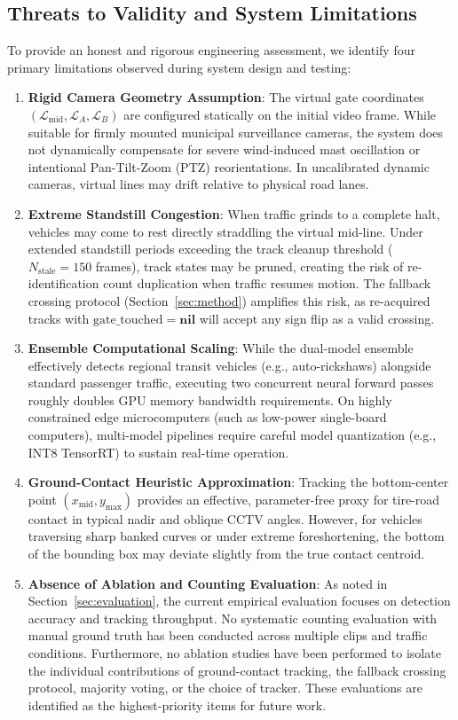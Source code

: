 \subsection{Threats to Validity and System Limitations}
To provide an honest and rigorous engineering assessment, we identify four primary limitations observed during system design and testing:
\begin{enumerate}
    \item \textbf{Rigid Camera Geometry Assumption}: The virtual gate coordinates $(\mathcal{L}_{\text{mid}}, \mathcal{L}_A, \mathcal{L}_B)$ are configured statically on the initial video frame. While suitable for firmly mounted municipal surveillance cameras, the system does not dynamically compensate for severe wind-induced mast oscillation or intentional Pan-Tilt-Zoom (PTZ) reorientations. In uncalibrated dynamic cameras, virtual lines may drift relative to physical road lanes.
    \item \textbf{Extreme Standstill Congestion}: When traffic grinds to a complete halt, vehicles may come to rest directly straddling the virtual mid-line. Under extended standstill periods exceeding the track cleanup threshold ($N_{\text{stale}} = 150$ frames), track states may be pruned, creating the risk of re-identification count duplication when traffic resumes motion. The fallback crossing protocol (Section~\ref{sec:method}) amplifies this risk, as re-acquired tracks with $\text{gate\_touched} = \mathbf{nil}$ will accept any sign flip as a valid crossing.
    \item \textbf{Ensemble Computational Scaling}: While the dual-model ensemble effectively detects regional transit vehicles (e.g., auto-rickshaws) alongside standard passenger traffic, executing two concurrent neural forward passes roughly doubles GPU memory bandwidth requirements. On highly constrained edge microcomputers (such as low-power single-board computers), multi-model pipelines require careful model quantization (e.g., INT8 TensorRT) to sustain real-time operation.
    \item \textbf{Ground-Contact Heuristic Approximation}: Tracking the bottom-center point $(x_{\text{mid}}, y_{\text{max}})$ provides an effective, parameter-free proxy for tire-road contact in typical nadir and oblique CCTV angles. However, for vehicles traversing sharp banked curves or under extreme foreshortening, the bottom of the bounding box may deviate slightly from the true contact centroid.
    \item \textbf{Absence of Ablation and Counting Evaluation}: As noted in Section~\ref{sec:evaluation}, the current empirical evaluation focuses on detection accuracy and tracking throughput. No systematic counting evaluation with manual ground truth has been conducted across multiple clips and traffic conditions. Furthermore, no ablation studies have been performed to isolate the individual contributions of ground-contact tracking, the fallback crossing protocol, majority voting, or the choice of tracker. These evaluations are identified as the highest-priority items for future work.
\end{enumerate}

